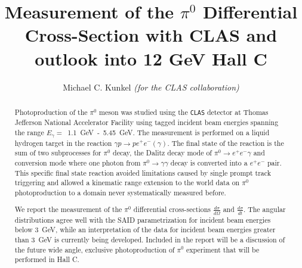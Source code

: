\documentclass{aip-cp}
\begin{document}
\title{Measurement of the $\pi^0$ Differential Cross-Section with CLAS and outlook into 12 GeV Hall C}

\author[aff1]{Michael C. Kunkel {\it (for the CLAS collaboration) }}

\maketitle

\begin{abstract}
Photoproduction of the $\pi^0$ meson was studied using the \textsc{\texttt{CLAS}} detector at Thomas Jefferson National Accelerator Facility using tagged incident beam energies spanning the range $E_{\gamma}=$~1.1~GeV~-~5.45~GeV. The measurement is performed on a liquid hydrogen target in the reaction $\gamma p\to pe^+e^-(\gamma)$. The final state of the reaction is the sum of two subprocesses for $\pi^0$ decay, the Dalitz decay mode of $\pi^0\to e^+e^-\gamma$ and conversion mode where one photon from $\pi^0\to \gamma\gamma$ decay is converted into a $e^+e^-$ pair. This specific final state reaction avoided limitations caused by single prompt track triggering and allowed a kinematic range extension to the world data on $\pi^0$ photoproduction to a domain never systematically measured before.

We report the measurement of the $\pi^0$ differential cross-sections $\frac{d\sigma}{d\Omega}$ and $\frac{d\sigma}{dt}$. The angular distributions agree well with the SAID parametrization for incident beam energies below 3~GeV, while an interpretation of the data for incident beam energies greater than 3~GeV is currently being developed. Included in the report will be a discussion of the future wide angle, exclusive photoproduction of $\pi^0$ experiment that will be performed in Hall C.
\end{abstract}

\end{document}
